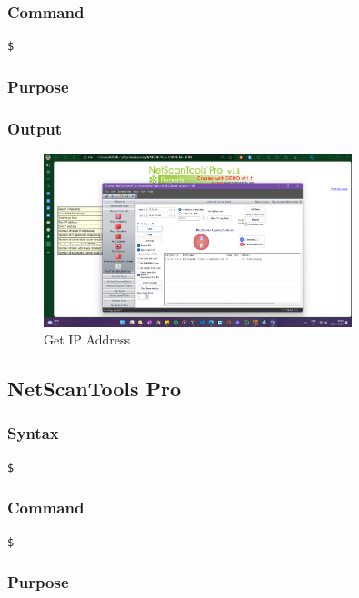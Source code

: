 \documentclass[11pt]{article}
\begin{document}
\subsubsection*{Command}
\begin{verbatim}
$
\end{verbatim}

\subsubsection*{Purpose}

\subsubsection*{Output}
\begin{figure}[H]
    \centering
    \includegraphics[width=0.8\textwidth]{statdemo (1).png}
    \caption{Get IP Address}
    \label{fig:1}
\end{figure}

\subsection{NetScanTools Pro}

\subsubsection*{Syntax}
\begin{verbatim}
$
\end{verbatim}

\subsubsection*{Command}
\begin{verbatim}
$
\end{verbatim}

\subsubsection*{Purpose}
\end{document}
